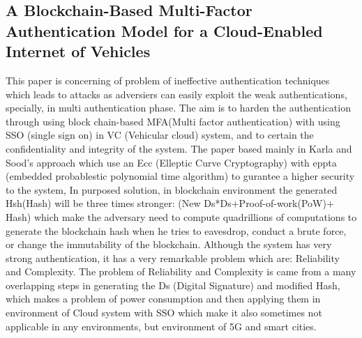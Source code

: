 			\subsection{A Blockchain-Based Multi-Factor Authentication Model for a Cloud-Enabled Internet of Vehicles \cite{paper8}}
			This paper is concerning of problem of ineffective authentication techniques which leads to attacks as adversiers can easily exploit the weak authentications, specially, in multi authentication phase. The aim is to harden the authentication through using block chain-based MFA(Multi factor authentication) with using SSO (single sign on) in VC (Vehicular cloud) system, and to certain the confidentiality and integrity of the system. The paper based mainly in Karla and Sood's approach which use an Ecc (Elleptic Curve Cryptography) with eppta (embedded probablestic polynomial time algorithm) to gurantee a higher security to the system, In purposed solution, in blockchain environment the generated Hsh(Hash) will be three times stronger: (New Ds*Ds+Proof-of-work(PoW)+ Hash) which make the adversary need to compute quadrillions of computations to generate the blockchain hash when he tries to eavesdrop, conduct a brute force, or change the immutability of the blockchain. Although the system has very strong authentication, it has a very remarkable problem which are: Reliability and Complexity. The problem of Reliability and Complexity is came from a many overlapping steps in generating the Ds (Digital Signature) and modified Hash, which makes a problem of power consumption and then applying them in environment of Cloud system with SSO which make it also sometimes not applicable in any environments, but environment of 5G and smart cities. 

